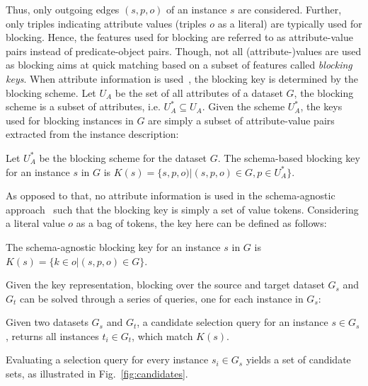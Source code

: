 Thus, only outgoing edges $(s, p, o)$ of an instance $s$ are considered. Further, only triples indicating attribute values (triples $o$ as a literal) are typically used for blocking. Hence, the features used for blocking are referred to as attribute-value pairs instead of predicate-object pairs. Though, not all (attribute-)values are used as blocking aims at quick matching based on a subset of features called \emph{blocking keys}. When attribute information is used~\cite{}, the blocking key is determined by the blocking scheme. Let $U_A$ be the set of all attributes of a dataset $G$, the blocking scheme is a subset of attributes, i.e. $U^*_A  \subseteq U_A$. Given the scheme $U^*_A$, the keys used for blocking instances in $G$ are simply a subset of attribute-value pairs extracted from the instance description:  

\begin{definition} Let $U^*_A$ be the blocking scheme for the dataset $G$. The schema-based blocking key for an instance $s$ in $G$ is $K(s) =\{ s, p, o) | (s, p, o) \in G, p \in U^*_A \}$. 
\end{definition} 

As opposed to that, no attribute information is used in the schema-agnostic approach~\cite{} such that the blocking key is simply a set of value tokens. Considering a literal value $o$ as a bag of tokens, the key here can be defined as follows:

\begin{definition} The schema-agnostic blocking key for an instance $s$ in $G$ is $K(s) =\{ k \in o | (s, p, o) \in G \}$. 
\end{definition} 

Given the key representation, blocking over the source and target dataset $G_s$ and $G_t$ can be solved through a series of queries, one for each instance in $G_s$:

\begin{definition}   Given two datasets $G_s$ and $G_t$, a candidate selection query for an instance $s \in G_s$, returns all instances $t_i \in G_t$, which match $K(s)$. 
\end{definition} 

Evaluating a selection query for every instance $s_i \in G_s$ yields a set of candidate sets, as illustrated in Fig.~\ref{fig:candidates}.

